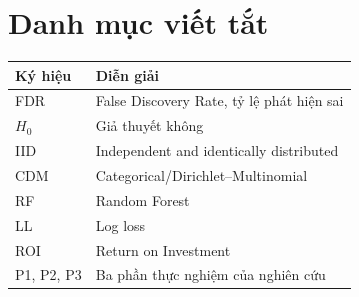 \chapter*{Danh mục viết tắt}
\begin{longtable}{p{}p{}}
\textbf{Ký hiệu} & \textbf{Diễn giải}\\\toprule
FDR & False Discovery Rate, tỷ lệ phát hiện sai\\
$H_0$ & Giả thuyết không\\
IID & Independent and identically distributed\\
CDM & Categorical/Dirichlet--Multinomial\\
RF & Random Forest\\
LL & Log loss\\
ROI & Return on Investment\\
P1, P2, P3 & Ba phần thực nghiệm của nghiên cứu\\
\end{longtable}
